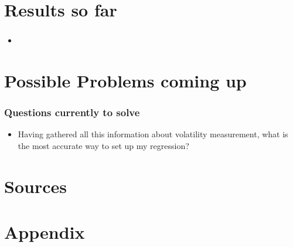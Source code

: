 \documentclass[aspectratio=169]{beamer}
\begin{document}
\section{Results so far}

\begin{frame}
\frametitle{}
	\begin{itemize}
	\item
	\end{itemize}
\end{frame}


\section{Possible Problems coming up}

\begin{frame}
\frametitle{Questions currently to solve}
	\begin{itemize}
	\item Having gathered all this information about volatility measurement, what is the most accurate way to set up my regression?
	
	\end{itemize}
\end{frame}

\section*{Sources}
\begin{frame}
\printbibliography
\end{frame}

\section{Appendix}
\begin{frame}

\end{frame}
\end{document}
